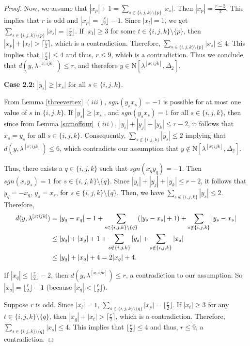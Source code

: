 \documentclass{amsart}
\theoremstyle{definition}
\theoremstyle{remark}
\numberwithin{equation}{section}
\newcommand{\D}{\Delta}
\newcommand{\f}{\lfloor\frac{r}{2}\rfloor}
\newcommand{\cil}{\lceil\frac{r}{2}\rceil}
\def\n{{\mathrm{N}}}
\begin{document}
\begin{proof}
	Now, we assume that $|x_p|+1=\sum_{s \in \{i, j, k\}\setminus \{p\}} |x_s|$. Then $|x_p|=\frac{r-3}{2}$. This implies that $r$ is odd and $|x_p|=\f-1$. Since $|x_l|=1$, we get $\sum_{s \in \{i, j, k\}\setminus \{p\}} |x_s|=\f$. If $|x_t|\geq 3$ for some $t\in \{i, j, k\}\setminus \{p\}$, then $|x_p|+|x_t|>\cil$, which is a contradiction. Therefore,  $\sum_{s \in \{i, j, k\}\setminus \{p\}} |x_s|\leq 4$. This implies that $\f\leq 4$ and thus, $r\leq 9$, which is a contradiction. Thus we conclude that $d(y, \lambda^{[x;ijk]}) \leq r$, and therefore $y \in \n[\lambda^{[x;ijk]}, \D_2]$.
	
	
	
	
    \smallskip
	\noindent \textbf{Case 2.2:} $|y_s|\geq |x_s|$ for all $s\in\{i,j,k\}$. 
	
	
	From Lemma \ref{threevertex} $(iii)$, $sgn(y_sx_s)=-1$ is possible for at most one value of $s$ in $\{i,j,k\}$. 
	If $|y_s|\geq |x_s|$, and $sgn(y_sx_s)=1$ for all $s\in \{i,j,k\}$, then since from Lemma \ref{sumoffour} $(iii)$,   $|y_i|+|y_j|+|y_k|\leq r-2$, it follows that $x_s=y_s$ for all $s\in \{i,j,k\}$. Consequently, $\sum_{s\notin\{i,j,k\}}|y_s|\leq 2$ implying that $d(y,\lambda^{[x;ijk]})\leq 6$, which contradicts our assumption that $y\notin \n[\lambda^{[x;ijk]},\D_2]$.  
	
	Thus, there exists a $q\in\{i,j,k\}$ such that $sgn(x_qy_q)=-1$. Then $sgn(x_sy_s)=1$ for $s\in\{i,j,k\}\setminus\{q\}$. Since $|y_i|+|y_j|+|y_k|\leq r-2$, it follows that $y_q=-x_q$, $y_s=x_s$, for $s\in\{i,j,k\}\setminus\{q\}$. Then, we have $\sum_{s\notin\{i,j,k\}}|y_s|\leq 2$. Therefore, 
	\begin{align}
		d(y,\lambda^{[x;ijk]})&=|y_q-x_q|-1+\sum_{s\in\{i,j,k\}\setminus\{q\}}(|y_s-x_s|+1)+\sum_{s\notin\{i,j,k\}}|y_s-x_s| \notag
		\\
		&\leq |y_q|+|x_q|+1+\sum_{s\notin\{i,j,k\}}|y_s|+\sum_{s\notin\{i,j,k\}}|x_s| \notag
		\\
		&\leq |y_q|+|x_q|+4 = 2|x_q|+4. \label{eq3}
	\end{align}
	
	If $|x_q|  \leq \f-2 $, then  $d(y,\lambda^{[x;ijk]}) \leq r$, a contradiction to our assumption. So   $|x_q|=\f-1$ (because $|x_q|< \f$). 
	
	Suppose $r$ is odd. Since $|x_l|=1$,  $\sum_{s \in \{i, j, k\}\setminus \{q\}} |x_s|=\f$. If $|x_t|\geq 3$ for any $t\in \{i, j, k\}\setminus \{q\}$, then $|x_q|+|x_t|>\cil$, which is a contradiction. Therefore,  $\sum_{s \in \{i, j, k\}\setminus \{q\}} |x_s|\leq 4$. This implies that $\f\leq 4$ and thus, $r\leq 9$, a contradiction. 
	

\end{proof}
\end{document}
